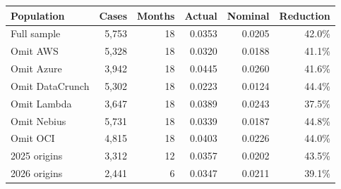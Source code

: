 \begin{tabular}{lrrrrr}
\toprule
Population & Cases & Months & Actual & Nominal & Reduction \\
\midrule
Full sample & 5,753 & 18 & 0.0353 & 0.0205 & 42.0\% \\
Omit AWS & 5,328 & 18 & 0.0320 & 0.0188 & 41.1\% \\
Omit Azure & 3,942 & 18 & 0.0445 & 0.0260 & 41.6\% \\
Omit DataCrunch & 5,302 & 18 & 0.0223 & 0.0124 & 44.4\% \\
Omit Lambda & 3,647 & 18 & 0.0389 & 0.0243 & 37.5\% \\
Omit Nebius & 5,731 & 18 & 0.0339 & 0.0187 & 44.8\% \\
Omit OCI & 4,815 & 18 & 0.0403 & 0.0226 & 44.0\% \\
2025 origins & 3,312 & 12 & 0.0357 & 0.0202 & 43.5\% \\
2026 origins & 2,441 & 6 & 0.0347 & 0.0211 & 39.1\% \\
\bottomrule
\end{tabular}
